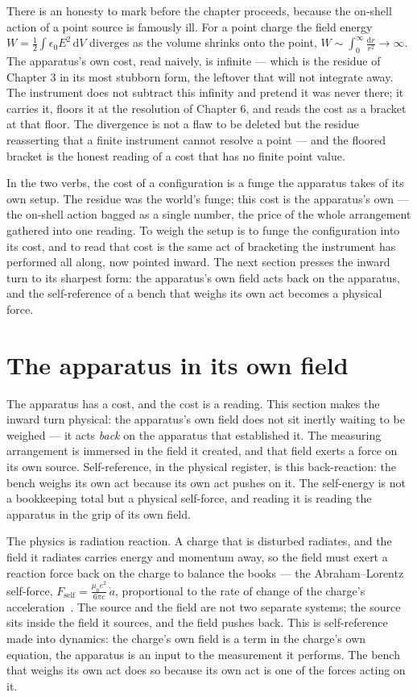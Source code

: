 There is an honesty to mark before the chapter proceeds, because the on-shell action of a point source is famously ill. For a
point charge the field energy $W = \tfrac12\int \epsilon_0 E^2\,\mathrm{d}V$ diverges as the volume shrinks onto the point,
$W \sim \int_0^\infty \frac{\mathrm{d}r}{r^2} \to \infty$. The apparatus's own cost, read naively, is infinite --- which is
the residue of Chapter 3 in its most stubborn form, the leftover that will not integrate away. The instrument does not
subtract this infinity and pretend it was never there; it carries it, floors it at the resolution of Chapter 6, and reads the
cost as a bracket at that floor. The divergence is not a flaw to be deleted but the residue reasserting that a finite
instrument cannot resolve a point --- and the floored bracket is the honest reading of a cost that has no finite point value.

In the two verbs, the cost of a configuration is a funge the apparatus takes of its own setup. The residue was the world's
funge; this cost is the apparatus's own --- the on-shell action bagged as a single number, the price of the whole
arrangement gathered into one reading. To weigh the setup is to funge the configuration into its cost, and to read that cost
is the same act of bracketing the instrument has performed all along, now pointed inward. The next section presses the
inward turn to its sharpest form: the apparatus's own field acts back on the apparatus, and the self-reference of a bench
that weighs its own act becomes a physical force.

\section{The apparatus in its own field}

The apparatus has a cost, and the cost is a reading. This section makes the inward turn physical: the apparatus's own field
does not sit inertly waiting to be weighed --- it acts \emph{back} on the apparatus that established it. The measuring
arrangement is immersed in the field it created, and that field exerts a force on its own source. Self-reference, in the
physical register, is this back-reaction: the bench weighs its own act because its own act pushes on it. The self-energy is
not a bookkeeping total but a physical self-force, and reading it is reading the apparatus in the grip of its own field.

The physics is radiation reaction. A charge that is disturbed radiates, and the field it radiates carries energy and
momentum away, so the field must exert a reaction force back on the charge to balance the books --- the Abraham--Lorentz
self-force, $F_{\text{self}} = \frac{\mu_0 e^2}{6\pi c}\,\dot{a}$, proportional to the rate of change of the charge's
acceleration~\cite{lorentz1904}. The source and the field are not two separate systems; the source sits inside the field it
sources, and the field pushes back. This is self-reference made into dynamics: the charge's own field is a term in the
charge's own equation, the apparatus is an input to the measurement it performs. The bench that weighs its own act does so
because its own act is one of the forces acting on it.

